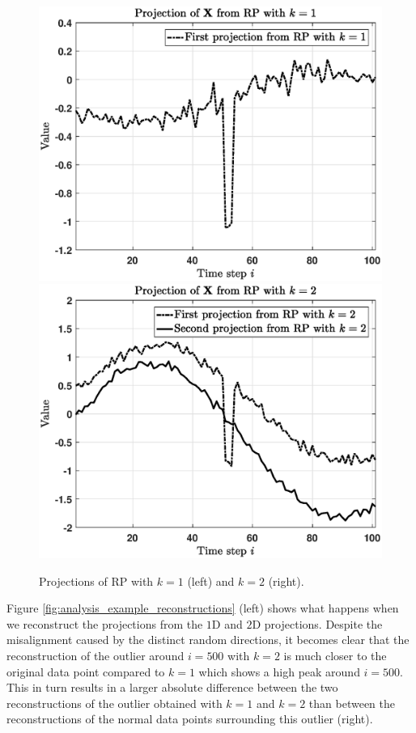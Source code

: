 \begin{figure}[h]
	\centering
	\vspace{-0.15cm}
	\includegraphics[scale=0.35]{analysis/Analysis_deltarp_projection1}
	\includegraphics[scale=0.35]{analysis/Analysis_deltarp_projection2}
	\caption{Projections of RP with $k=1$ (left) and $k=2$ (right).}
	\label{fig:analysis_example_projections}
	\vspace{-0.3cm}
\end{figure}

Figure \ref{fig:analysis_example_reconstructions} (left) shows what happens when we reconstruct the projections from the $1$D and $2$D projections. Despite the misalignment caused by the distinct random directions, it becomes clear that the reconstruction of the outlier around $i=500$ with $k=2$ is much closer to the original data point compared to $k=1$ which shows a high peak around $i=500$. This in turn results in a larger absolute difference between the two reconstructions of the outlier obtained with $k=1$ and $k=2$ than between the reconstructions of the normal data points surrounding this outlier (right). 

